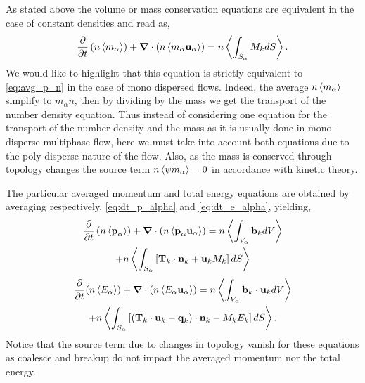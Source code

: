 As stated above the volume or mass conservation equations are equivalent in the case of constant densities and read as, 
\begin{equation}
    \frac{\partial}{\partial t}   \left(n \left<m_\alpha\right>\right)
    + \bm{\nabla} \cdot \left(n \left<m_\alpha \textbf{u}_\alpha\right>\right) 
    = 
    n \left<\int_{S_\alpha} M_k d S\right>. 
    \label{eq:avg_p_m_mass}
\end{equation}
We would like to highlight that this equation is strictly equivalent to \ref{eq:avg_p_n} in the case of mono dispersed flows. 
Indeed, the average $n \left<m_\alpha\right>$ simplify to $m_\alpha n$, then by dividing by the mass we get the transport of the number density equation. 
Thus instead of considering one equation for the transport of the number density and the mass as it is usually done in mono-disperse multiphase flow, here we must take into account both equations due to the poly-disperse nature of the flow. 
Also, as the mass is conserved through topology changes the source term $n \left<\psi m_\alpha\right> = 0$ in accordance with kinetic theory.

The particular averaged momentum and total energy equations are obtained by averaging respectively, \ref{eq:dt_p_alpha} and \ref{eq:dt_e_alpha}, yielding, 
\begin{multline}
    \frac{\partial}{\partial t}   \left(n \left<\textbf{p}_\alpha\right>\right)
    + \bm{\nabla} \cdot (n \left<\textbf{p}_\alpha \textbf{u}_\alpha\right>)
    = n \left<\int_{V_\alpha} \textbf{b}_k dV\right>\\
    + n \left<\int_{S_\alpha} \left[\textbf{T}_k  \cdot \textbf{n}_k  + \textbf{u}_k M_k \right]d S\right>
    \label{eq:avg_p_momentum}
\end{multline}
\begin{multline}
    \frac{\partial}{\partial t} (n \left<E_\alpha\right>)
    + \bm{\nabla} \cdot ( n \left<E_\alpha \textbf{u}_\alpha\right>)
    = n \left<\int_{V_\alpha} \textbf{b}_k \cdot \textbf{u}_k dV\right>\\
    + n \left<\int_{S_\alpha} \left[
        (\textbf{T}_k\cdot \textbf{u}_k 
    - \textbf{q}_k)\cdot\textbf{n}_k 
    - M_k E_k 
    \right]dS\right>.
    \label{eq:avg_p_energy}
\end{multline}
Notice that the source term due to changes in topology vanish for these equations as coalesce and breakup do not impact the averaged momentum nor the total energy.  
